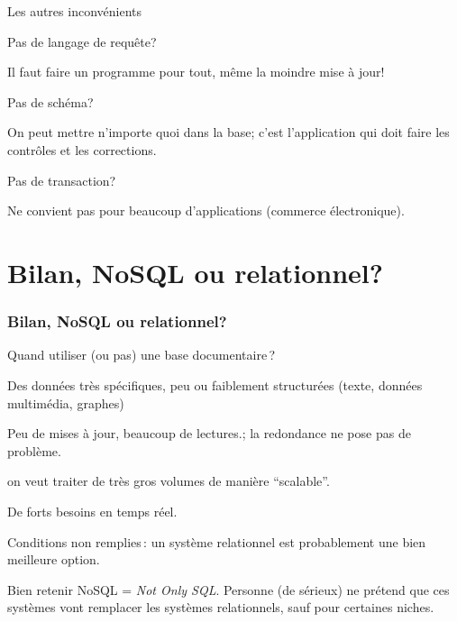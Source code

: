 \begin{frame}[fragile]{Les autres inconvénients}

\alert{Pas de langage de requête?}

Il faut faire un programme pour tout, même la moindre mise à jour!

\vfill
\alert{Pas de schéma}?

On peut mettre n'importe quoi dans la base; c'est l'application qui doit faire les contrôles et les corrections.

\vfill

\alert{Pas de transaction?}

Ne convient pas pour beaucoup d'applications (commerce électronique).


\end{frame}

\section{Bilan, NoSQL ou relationnel?}

\begin{frame}[fragile]
\frametitle{Bilan, NoSQL ou relationnel?}

Quand utiliser (ou pas) une base documentaire\,?

\begin{redbullet}
  \item \alert{Des données très spécifiques, peu ou faiblement structurées} (texte, données multimédia, graphes)
  
  \item \alert{Peu de mises à jour, beaucoup de lectures.}; la redondance ne pose pas de problème.
  
  \item \alert{on veut traiter de très gros volumes de manière ``scalable''}.     


  \item \alert{De forts besoins en temps réel}.     
\end{redbullet}

Conditions non remplies\,: un système relationnel est probablement une bien meilleure option.

\begin{remblock}{Bien retenir}
NoSQL = \textit{Not Only SQL}. Personne (de sérieux) ne prétend que ces systèmes vont
remplacer les systèmes relationnels, sauf pour certaines niches.
\end{remblock}

\end{frame}

